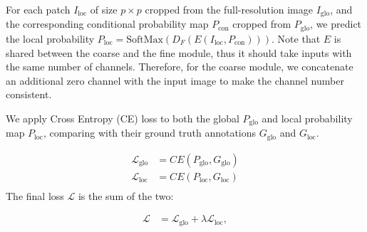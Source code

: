 For each patch $I_\textrm{loc}$ of size $p \times p$ cropped from the full-resolution image $I_\textrm{glo}$, and the corresponding conditional probability map $P_\textrm{con}$ cropped from $P_\textrm{glo}$, we predict the local probability $P_\textrm{loc} = \textrm{SoftMax}(D_F(E(I_\textrm{loc}, P_\textrm{con})))$. 
Note that $E$ is shared between the coarse and the fine module, thus it should take inputs with the same number of channels. Therefore, for the coarse module, we concatenate an additional zero channel with the input image to make the channel number consistent.


We apply Cross Entropy (CE) loss to both the global $P_\textrm{glo}$ and local probability map $P_\textrm{loc}$, comparing with their ground truth annotations $G_\textrm{glo}$ and $G_\textrm{loc}$.

\vspace{-2mm}
\begin{equation}
\begin{aligned}
    \mathcal{L}_\textrm{glo} &= CE (P_\textrm{glo}, G_\textrm{glo}) \\
    \mathcal{L}_\textrm{loc} &= CE (P_\textrm{loc}, G_\textrm{loc}) \\
\end{aligned}
\end{equation}
The final loss $\mathcal{L}$ is the sum of the two:

\vspace{-3mm}
\begin{equation}
\begin{aligned}
    \mathcal{L} &= \mathcal{L}_ \textrm{glo} + \lambda \mathcal{L}_ \textrm{loc},
\end{aligned}
\end{equation}


